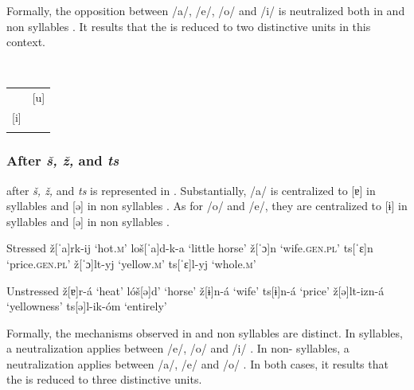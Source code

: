 \documentclass[output=paper,modfonts,newtxmath,hidelinks,]{langscibook}
\begin{document}
\noindent Formally, the opposition between /a/, /e/, /o/ and /i/ is neutralized both in  and non  syllables . It results that the   is reduced to two distinctive units in this context.

\label{5:6}\\\medskip
\begin{tabular}{|p{1.7cm}p{1.7cm}|}
\hline
&\multicolumn{1}{|c|}{[u]}\\\cline{2-2}
\multicolumn{1}{|c}{[i]}&\\
&\\\hline
\end{tabular}
\z

\newpage 
\subsubsection{After \textit{š, ž,} and \textit{ts}}\label{5:s2.1.3}

  after \textit{š, ž,} and \textit{ts} is represented in . Substantially, /a/ is centralized to [ɐ] in  syllables  and [ə] in non  syllables . As for /o/ and /e/, they are centralized to [ɨ] in  syllables  and [ə] in non  syllables .%

\ea\label{5:7}\begin{multicols}{2}
\begin{xlist}
\exi{} {Stressed}
\ex ž[ˈa]rk-ij \tabto{2.1cm}‘hot.\textsc{m}’\label{5:7a}
\ex loš[ˈa]d-k-a \tabto{2.1cm}‘little horse’\label{5:7b}
\ex ž[ˈɔ]n \tabto{2.1cm}‘wife.\textsc{gen.pl}’\label{5:7c}
\exi{} ts[ˈɛ]n \tabto{2.1cm}‘price.\textsc{gen.pl}’
\ex ž[ˈɔ]lt-yj \tabto{2.1cm}‘yellow.\textsc{m}’\label{5:7d}
\exi{} ts[ˈɛ]l-yj \tabto{2.1cm}‘whole.\textsc{m}’
\end{xlist}\columnbreak
\begin{xlist}
\exi{} {Unstressed}
\exi{} ž[ɐ]r-á \tabto{2.1cm}‘heat’
\exi{} lóš[ə]d’ \tabto{2.1cm}‘horse’
\exi{} ž[ɨ]n-á \tabto{2.1cm}‘wife’
\exi{} ts[ɨ]n-á \tabto{2.1cm}‘price’
\exi{} ž[ə]lt-izn-á \tabto{2.1cm}‘yellowness’
\exi{} ts[ə]l-ik-óm \tabto{2.1cm}‘entirely’
\end{xlist}
\end{multicols}
\z

\noindent Formally, the mechanisms observed in  and non  syllables are distinct. In  syllables, a neutralization applies between /e/, /o/ and /i/ . In non- syllables, a neutralization applies between /a/, /e/ and /o/ . In both cases, it results that the   is reduced to three distinctive units.
\end{document}
